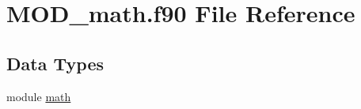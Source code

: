 \hypertarget{MOD__math_8f90}{\section{M\-O\-D\-\_\-math.\-f90 File Reference}
\label{MOD__math_8f90}
}
\subsection*{Data Types}
\begin{DoxyCompactItemize}
\item 
module \hyperlink{classmath}{math}
\end{DoxyCompactItemize}

